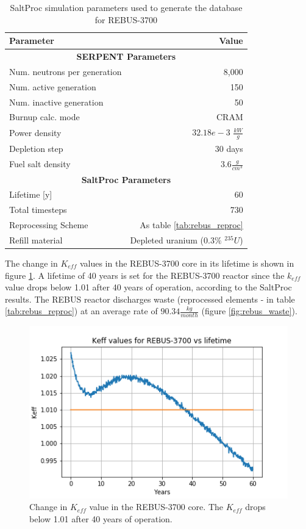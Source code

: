 \begin{table}[h]
	\centering
	\caption{SaltProc simulation parameters used to generate the database for REBUS-3700}
	\begin{tabular}{lr}
		\hline
		\textbf{Parameter} & \textbf{Value}\\
		\hline
		\multicolumn{2}{c}{\textbf{SERPENT Parameters}} \\
		\hline
		Num. neutrons per generation & 8,000 \\
		Num. active generation & 150\\
		Num. inactive generation & 50 \\
		Burnup calc. mode & CRAM \\
		Power density & $32.18e-3$ $\frac{kW}{g}$ \\ 
		Depletion step & 30 days\\
		Fuel salt density & $3.6 \frac{g}{cm^3}$ \\
		\hline
		\multicolumn{2}{c}{\textbf{SaltProc Parameters}} \\
		\hline
		Lifetime [y]  & 60 \\
		Total timesteps & 730 \\
		Reprocessing Scheme & As table \ref{tab:rebus_reproc}\\
		Refill material & Depleted uranium ($0.3\%$ $^{235}U$) \\
		\hline
	\end{tabular}
	\label{tab:saltproc-run-params}
\end{table}

The change in $K_{eff}$ values in the REBUS-3700 core in its lifetime is shown in figure \ref{fig:keff}.
A lifetime of 40 years is set for the REBUS-3700 reactor since the $k_{eff}$
value drops below 1.01 after 40 years of operation, according to the SaltProc results.
The REBUS reactor discharges
waste (reprocessed elements - in table \ref{tab:rebus_reproc}) at an average rate of
$90.34 \frac{kg}{month}$ (figure \ref{fig:rebus_waste}).


\begin{figure}[htbp!]
	\begin{center}
		\includegraphics[scale=0.7]{./images/us/keff.png}
	\end{center}
	\caption{Change in $K_{eff}$ value in the REBUS-3700 core. The $K_{eff}$ drops below
		1.01 after 40 years of operation.}
	\label{fig:keff}
\end{figure}

